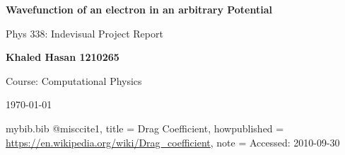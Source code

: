 \documentclass[10pt, a4paper]{article}
\newcommand\course{Course}                            %
\begin{document}
\begin{titlepage}
    \begin{center}
        \vspace*{3cm}
            
        \Huge
        \textbf{Wavefunction of an electron in an arbitrary Potential}
            
        \vspace{1cm}
        \huge
        Phys 338: Indevisual Project Report
            
        \vspace{1.5cm}
        \Large
            
        \textbf{Khaled Hasan 1210265}                      %
        
            
        \vfill
        
        \course: Computational Physics
            
        \vspace{1cm}
        
        \Large
        
        \today
            
    \end{center}
\end{titlepage}
\begin{filecontents}{mybib.bib}
@misc{cite1,
  title = {Drag Coefficient},
  howpublished = {\url{https://en.wikipedia.org/wiki/Drag_coefficient}},
  note = {Accessed: 2010-09-30}
}
\end{filecontents}
\newpage
\tableofcontents
\newpage
\end{document}
